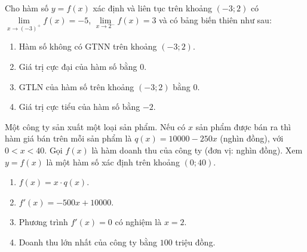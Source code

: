 \begin{baitap}
	Cho hàm số $y=f(x)$ xác định và liên tục trên khoảng $(-3; 2)$ có $\lim\limits_{x \to (-3)^+} f(x) = -5$, $\lim\limits_{x \to 2^-} f(x) = 3$ và có bảng biến thiên như sau:

\begin{minipage}{0.55\textwidth}
	\begin{enumerate}[\quad \bf a)]
		\item Hàm số không có GTNN trên khoảng $(-3; 2)$.
		\item Giá trị cực đại của hàm số bằng $0$.
		\item GTLN của hàm số trên khoảng $(-3; 2)$ bằng $0$.
		\item Giá trị cực tiểu của hàm số bằng $-2$.
	\end{enumerate}
\end{minipage}	
\begin{minipage}{0.45\textwidth}
	\begin{center}
	\end{center}
\end{minipage}
\end{baitap}

\begin{baitap}
	Một công ty sản xuất một loại sản phẩm. Nếu có $x$ sản phẩm được bán ra thì hàm giá bán trên mỗi sản phẩm là $q(x) = 10000 - 250x$ (nghìn đồng), với $0 < x < 40$. Gọi $f(x)$ là hàm doanh thu của công ty (đơn vị: nghìn đồng). Xem $y = f(x)$ là một hàm số xác định trên khoảng $(0; 40)$. 
	\begin{enumerate}[\quad \bf a)]
		\item $f(x) = x \cdot q(x)$.
		\item $f'(x) = -500x + 10000$.
		\item Phương trình $f'(x) = 0$ có nghiệm là $x = 2$.
		\item Doanh thu lớn nhất của công ty bằng $100$ triệu đồng.
	\end{enumerate}
\end{baitap}


